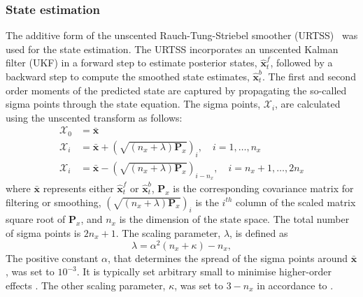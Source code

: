 \documentclass[]{article}
\begin{document}
\subsubsection{State estimation}
The additive form of the unscented Rauch-Tung-Striebel smoother (URTSS)~\cite{Sarkka2010} was used for the state estimation. The URTSS incorporates an unscented Kalman filter (UKF) \cite{Julier1997, Merwe2003} in a forward step to estimate posterior states, $\hat{\mathbf x}_t^{f}$, followed by a backward step to compute the smoothed state estimates, $\hat{\mathbf x}_t^{b}$. The first and second order moments of the predicted state are captured by propagating the so-called sigma points through the state equation. The sigma points, $\mathcal X_i$, are calculated using the unscented transform as follows:
\begin{align}\label{eq:sigmapoints1}
	\mathcal X_{0}&=\mathbf{\bar x} \\
	\mathcal X_{i}&= \mathbf{\bar x}+\left(\sqrt{( n_x + \lambda)\mathbf P_x}\right)_i, \quad i=1, \dots, n_x \\
	\mathcal X_{i}&=\mathbf{\bar x}-\left(\sqrt{( n_x + \lambda)\mathbf P_x}\right)_{i- n_x}, \quad i= n_x+1, \dots, 2n_x 
\end{align}
where $\mathbf{\bar x}$ represents either $\hat{\mathbf x}_t^{f}$ or $\hat{\mathbf x}_t^{b}$, $\mathbf{P}_x$ is the corresponding covariance matrix for filtering or smoothing, $\left(\sqrt{( n_x + \lambda)\mathbf P_x}\right)_i$ is the $i^{th}$ column of the scaled matrix square root of $\mathbf P_x$, and $n_x$ is the dimension of the state space. The total number of sigma points is $2n_x+1$. The scaling parameter, $\lambda$, is defined as 
\begin{equation}\label{eq:sigmapoints3}
	\lambda=\alpha^2( n_x+\kappa) - n_x, 
\end{equation}
The positive constant $\alpha$, that determines the spread of the sigma points around $\mathbf{\bar x}$, was set to $10^{-3}$. It is typically set arbitrary small to minimise higher-order effects \cite{Haykin2001}. The other scaling parameter, $\kappa$, was set to $3-n_x$ in accordance to \cite{Julier2002a}.
\end{document}
